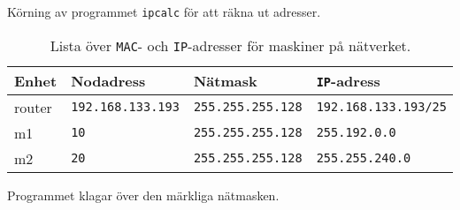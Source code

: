 \begin{listing}[H]
  \caption{Körning av programmet \texttt{ipcalc} för att räkna ut adresser.}
  \label{listing:sh_2-ipcalc}
\end{listing}


\begin{table}[]
  \centering
  \caption{Lista över \texttt{MAC}- och \texttt{IP}-adresser för maskiner på
           nätverket.}
  \label{table:interface-config}
  \begin{tabular}{@{}llll@{}}
    \toprule
    Enhet  & Nodadress                & Nätmask                  & \texttt{IP}-adress          \\ \midrule
    router & \texttt{192.168.133.193} & \texttt{255.255.255.128} & \texttt{192.168.133.193/25} \\
    m1     & \texttt{10}              & \texttt{255.255.255.128} & \texttt{255.192.0.0}        \\
    m2     & \texttt{20}              & \texttt{255.255.255.128} & \texttt{255.255.240.0}      \\ \bottomrule
  \end{tabular}
\end{table}

Programmet klagar över den märkliga nätmasken.
